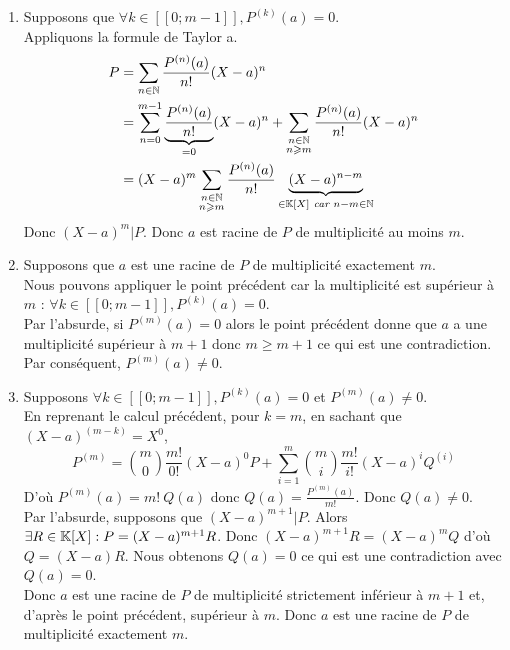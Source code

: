 \documentclass{article}
\renewenvironment{question_kholle}[2][ ]
{
	\subsection{\texorpdfstring{#2}{}}
	\notblank{#1}
	{
		\noindent #1
		\bigbreak
	}
	{}
	\begin{proof}
}
{
	\end{proof}
}
\begin{document}
\begin{question_kholle}
\begin{enumerate}[label=$\bullet$]
			\item Supposons que $\forall k \in [\![0;m-1]\!], P^{(k)}(a) = 0$. \\
			Appliquons la formule de Taylor a.
			\begin{equation*}
				\begin{aligned}
					P &= \sum_{n \in \mathbb N} \frac{P^{(n)}(a)}{n!} (X-a)^n \\
					&= \sum_{n = 0}^{m-1} \underbrace{ \frac{P^{(n)}(a)}{n!} }_{=0} (X-a)^n + \sum_{\substack{n \in \mathbb N \\ n \geqslant m}} \frac{P^{(n)}(a)}{n!} (X-a)^n \\
					&= (X-a)^m \sum_{\substack{n \in \mathbb N \\ n \geqslant m}} \frac{P^{(n)}(a)}{n!} \underbrace{(X-a)^{n-m}}_{\in \mathbb K[X] \textit{ car } n - m \in \mathbb N}
				\end{aligned}
			\end{equation*}
			Donc $(X-a)^m | P$. Donc $a$ est racine de $P$ de multiplicité au moins $m$.

			\item Supposons que $a$ est une racine de $P$ de multiplicité exactement $m$. \\
			Nous pouvons appliquer le point précédent car la multiplicité est supérieur à $m$ : $\forall k \in [\![0;m-1]\!], P^{(k)}(a) = 0$. \\
			Par l'absurde, si $P^{(m)}(a) = 0$ alors le point précédent donne que $a$ a une multiplicité supérieur à $m + 1$ donc $m \geqslant m + 1$ ce qui est une contradiction. \\
			Par conséquent, $P^{(m)}(a) \neq 0$.

			\item Supposons $\forall k \in [\![0;m-1]\!], P^{(k)}(a) = 0$ et $P^{(m)}(a) \neq 0$. \\
			En reprenant le calcul précédent, pour $k = m$, en sachant que $(X-a)^{(m-k)} = X^0$,
			\begin{equation*}
				P^{(m)} = \binom{m}{0} \frac{m!}{0!} (X-a)^{0} P + \sum_{i=1}^{m} \binom{m}{i} \frac{m!}{i!} (X-a)^{i} Q^{(i)}
			\end{equation*}
			D'où $P^{(m)}(a) = m! \ Q(a)$ donc $Q(a) = \frac{P^{(m)}(a)}{m!}$. Donc $Q(a) \neq 0$. \\
			Par l'absurde, supposons que $(X-a)^{m+1} | P$. Alors $\exists R \in \mathbb K[X] : P = (X-a)^{m+1} R$. Donc $(X-a)^{m+1} R = (X-a)^m Q$ d'où $Q = (X-a) R$. Nous obtenons $Q(a) = 0$ ce qui est une contradiction avec $Q(a) = 0$. \\
			Donc $a$ est une racine de $P$ de multiplicité strictement inférieur à $m + 1$ et, d'après le point précédent, supérieur à $m$. Donc $a$ est une racine de $P$ de multiplicité exactement $m$.
		\end{enumerate}
	\end{question_kholle}
\end{document}
